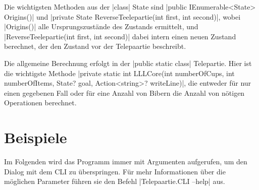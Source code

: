 \documentclass[a4paper,10pt,ngerman]{scrartcl}
\begin{document}
Die wichtigsten Methoden aus der |class| State sind |public IEnumerable<State> Origins()| und |private State ReverseTeelepartie(int first, int second)|, wobei |Origins()| alle Ursprungszustände des Zustands ermittelt, und |ReverseTeelepartie(int first, int second)| dabei intern einen neuen Zustand berechnet, der den Zustand vor der Telepaartie beschreibt. 

Die allgemeine Berechnung erfolgt in der |public static class| Telepartie. Hier ist die wichtigste Methode |private static int LLLCore(int numberOfCups, int numberOfItems, State? goal, Action<string>? writeLine)|, die entweder für nur einen gegebenen Fall oder für eine Anzahl von Bibern die Anzahl von nötigen Operationen berechnet.

\section{Beispiele}

Im Folgenden wird das Programm immer mit Argumenten aufgerufen, um den Dialog mit dem CLI zu überspringen. Für mehr Informationen über die möglichen Parameter führen sie den Befehl |Telepaartie.CLI --help| aus.
\end{document}
